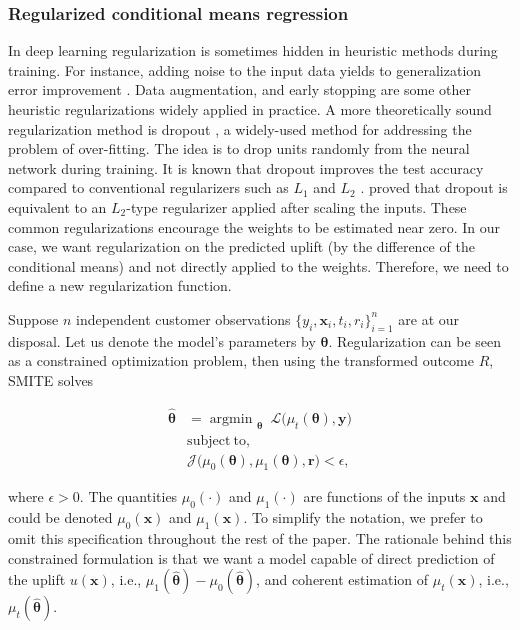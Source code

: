 \documentclass{article}
\def\x{\mathbf x}
\def\r{\mathbf r}
\def\y{\mathbf y}
\DeclareMathOperator*{\argmin}{argmin~} %
\begin{document}
\subsubsection{Regularized conditional means regression}
\label{sec:smite_to}

In deep learning regularization is sometimes hidden in heuristic methods during training. For instance, adding noise to the input data yields to generalization error improvement \citep{bishop1995training,rifai2011adding}. Data augmentation, and early stopping are some other heuristic regularizations widely applied in practice. A more theoretically sound regularization method is dropout \citep{srivastava2014dropout}, a widely-used method for addressing the problem of over-fitting. The idea is to drop units randomly from the neural network during training. It is known that dropout improves the test accuracy compared to conventional regularizers such as $L_1$ \citep{Tibshirani_lasso_1996} and $L_2$  \citep{srivastava2014dropout}. \citep{wager2013dropout} proved that dropout is equivalent to an $L_2$-type regularizer applied after scaling the inputs. These common regularizations encourage the weights to be estimated near zero. In our case, we want regularization on the predicted uplift (by the difference of the conditional means) and not directly applied to the weights. Therefore, we need to define a new regularization function. 

Suppose $n$ independent customer observations $\{y_i, \textbf{x}_i, t_i, r_i\}_{i=1}^n$ are at our disposal. Let us denote the model's parameters by $\boldsymbol{\theta}$. Regularization can be seen as a constrained optimization problem, then using the transformed outcome $R$, SMITE solves

\begin{align} 
     {\boldsymbol{\hat\theta}} & = \argmin_{\boldsymbol{\theta}} ~  \mathcal{L}\Big({\mu_t}(\boldsymbol{\theta}), \y\Big) \nonumber \\ 
     & \mathrm{subject~to,} \nonumber \\
        & \mathcal{J}\Big({\mu_0}(\boldsymbol{\theta}),{\mu_1}(\boldsymbol{\theta}), \r\Big) < \epsilon,
     \label{eq:objective}
\end{align}

where $\epsilon > 0$. The quantities $\mu_{0}(\cdot)$ and $\mu_{1}(\cdot)$ are functions of the inputs $\x$ and could be denoted $\mu_{0}(\x)$ and $\mu_{1}(\x)$. To simplify the notation, we prefer to omit this specification throughout the rest of the paper. The rationale behind this constrained formulation is that we want a model capable of direct prediction of the uplift $u(\x)$, i.e., $\mu_1(\boldsymbol{\hat\theta}) - \mu_0(\boldsymbol{\hat\theta})$, and coherent estimation of $\mu_t(\x)$, i.e., $\mu_t(\boldsymbol{\hat\theta})$. 
\end{document}
